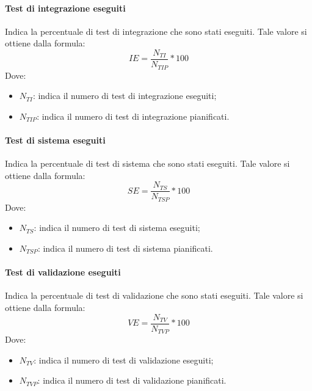 \documentclass[../PianoDiQualifica.tex]{subfiles}
\begin{document}
				\paragraph{Test di integrazione eseguiti}
				Indica la percentuale di test di integrazione che sono stati eseguiti.
				Tale valore si ottiene dalla formula:
				\begin{equation*}
					IE = \frac{N_{TI}}{N_{TIP}} * 100
				\end{equation*}
				Dove:
				\begin{itemize}
					\item \textbf{$N_{TI}$}: indica il numero di test di integrazione eseguiti;
					\item \textbf{$N_{TIP}$}: indica il numero di test di integrazione pianificati.
				\end{itemize}
				
				\paragraph{Test di sistema eseguiti}
				Indica la percentuale di test di sistema che sono stati eseguiti.
				Tale valore si ottiene dalla formula:
				\begin{equation*}
					SE = \frac{N_{TS}}{N_{TSP}} * 100
				\end{equation*}
				Dove:
				\begin{itemize}
					\item \textbf{$N_{TS}$}: indica il numero di test di sistema eseguiti;
					\item \textbf{$N_{TSP}$}: indica il numero di test di sistema pianificati.
				\end{itemize}
				
				\paragraph{Test di validazione eseguiti}
				Indica la percentuale di test di validazione che sono stati eseguiti.
				Tale valore si ottiene dalla formula:
				\begin{equation*}
					VE = \frac{N_{TV}}{N_{TVP}} * 100
				\end{equation*}
				Dove:
				\begin{itemize}
					\item \textbf{$N_{TV}$}: indica il numero di test di validazione eseguiti;
					\item \textbf{$N_{TVP}$}: indica il numero di test di validazione pianificati.
				\end{itemize}
				
\end{document}
